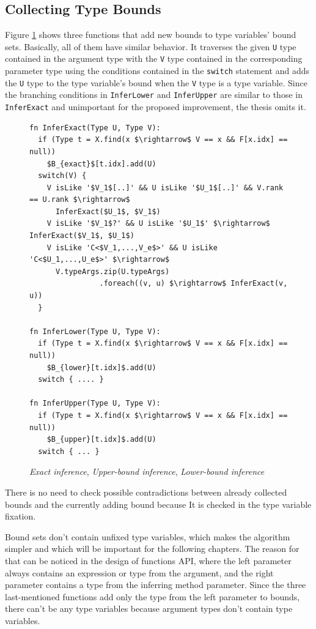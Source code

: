 \subsection{Collecting Type Bounds}

Figure \ref{img12:methodTypeInference3} shows three functions that add new bounds to type variables’
bound sets. 
Basically, all of them have similar behavior. 
It traverses the given \texttt{U} type contained in the argument type with the \texttt{V} type contained in the corresponding parameter type using the conditions contained in the \texttt{switch} statement and adds the \texttt{U} type to the type variable’s bound when the \texttt{V} type is a type variable. 
Since the branching conditions in \texttt{InferLower} and \texttt{InferUpper} are similar to those in \texttt{InferExact} and unimportant for the proposed improvement, the thesis omits it.
\begin{figure}[h!]
\begin{lstlisting}[style=myAlgo, mathescape=true]
fn InferExact(Type U, Type V):
  if (Type t = X.find(x $\rightarrow$ V == x && F[x.idx] == null)) 
    $B_{exact}$[t.idx].add(U)
  switch(V) {
    V isLike '$V_1$[..]' && U isLike '$U_1$[..]' && V.rank == U.rank $\rightarrow$ 
      InferExact($U_1$, $V_1$)
    V isLike '$V_1$?' && U isLike '$U_1$' $\rightarrow$ InferExact($V_1$, $U_1$)
    V isLike 'C<$V_1,...,V_e$>' && U isLike 'C<$U_1,...,U_e$>' $\rightarrow$
      V.typeArgs.zip(U.typeArgs)
                .foreach((v, u) $\rightarrow$ InferExact(v, u)) 
  }
  
fn InferLower(Type U, Type V):
  if (Type t = X.find(x $\rightarrow$ V == x && F[x.idx] == null)) 
    $B_{lower}[t.idx]$.add(U)
  switch { .... }
  
fn InferUpper(Type U, Type V):
  if (Type t = X.find(x $\rightarrow$ V == x && F[x.idx] == null)) 
    $B_{upper}[t.idx]$.add(U)
  switch { ... }
\end{lstlisting}
\caption{\textit{Exact inference}, \textit{Upper-bound inference}, \textit{Lower-bound inference}}
\label{img12:methodTypeInference3}
\end{figure}
\par
\begin{obs}
There is no need to check possible contradictions between already collected bounds and the currently adding bound because It is checked in the type variable fixation. 
\end{obs}
\begin{obs}
Bound sets don't contain unfixed type variables, which makes the algorithm simpler and which will be important for the following chapters.
The reason for that can be noticed in the design of functions API, where the left parameter always contains an expression or type from the argument, and the right parameter contains a type from the inferring method parameter. 
Since the three last-mentioned functions add only the type from the left parameter to bounds, there can’t be any type variables because argument types don’t contain type variables.
\end{obs}

